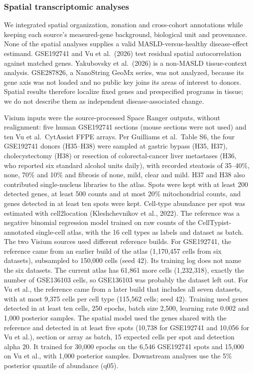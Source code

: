 \subsubsection{Spatial transcriptomic analyses}\label{spatial-transcriptomic-analyses}

We integrated spatial organization, zonation and cross-cohort annotations while keeping each source's measured-gene background, biological unit and provenance. None of the spatial analyses supplies a valid MASLD-versus-healthy disease-effect estimand. GSE192741 and Vu et al.~(2026) test residual spatial autocorrelation against matched genes. Yakubovsky et al.~(2026) is a non-MASLD tissue-context analysis. GSE287826, a NanoString GeoMx series, was not analyzed, because its gene axis was not loaded and no public key joins its areas of interest to donors. Spatial results therefore localize fixed genes and prespecified programs in tissue; we do not describe them as independent disease-associated change.

Visium inputs were the source-processed Space Ranger outputs, without realignment: five human GSE192741 sections (mouse sections were not used) and ten Vu et al.~CytAssist FFPE arrays. Per Guilliams et al.~Table S6, the four GSE192741 donors (H35--H38) were sampled at gastric bypass (H35, H37), cholecystectomy (H38) or resection of colorectal-cancer liver metastases (H36, who reported six standard alcohol units daily), with recorded steatosis of 35--40\%, none, 70\% and 10\% and fibrosis of none, mild, clear and mild. H37 and H38 also contributed single-nucleus libraries to the atlas. Spots were kept with at least 200 detected genes, at least 500 counts and at most 20\% mitochondrial counts, and genes detected in at least ten spots were kept. Cell-type abundance per spot was estimated with cell2location (Kleshchevnikov et al., 2022). The reference was a negative binomial regression model trained on raw counts of the CellTypist-annotated single-cell atlas, with the 16 cell types as labels and dataset as batch. The two Visium sources used different reference builds. For GSE192741, the reference came from an earlier build of the atlas (1,170,457 cells from six datasets), subsampled to 150,000 cells (seed 42). Its training log does not name the six datasets. The current atlas has 61,861 more cells (1,232,318), exactly the number of GSE136103 cells, so GSE136103 was probably the dataset left out. For Vu et al., the reference came from a later build that includes all seven datasets, with at most 9,375 cells per cell type (115,562 cells; seed 42). Training used genes detected in at least ten cells, 250 epochs, batch size 2,500, learning rate 0.002 and 1,000 posterior samples. The spatial model used the genes shared with the reference and detected in at least five spots (10,738 for GSE192741 and 10,056 for Vu et al.), section or array as batch, 15 expected cells per spot and detection alpha 20. It trained for 30,000 epochs on the 6,546 GSE192741 spots and 15,000 on Vu et al., with 1,000 posterior samples. Downstream analyses use the 5\% posterior quantile of abundance (q05).

